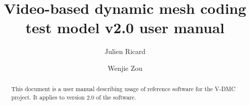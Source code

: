 \documentclass[a4paper,11pt]{mpegdoc}
\title{Video-based dynamic mesh coding test model v2.0 user manual}
\author{%
  Julien Ricard	\email{julien.ricard@interdital.com}  
\and
  Wenjie Zou \email{wjzou@xidian.edu.cn} 
}
\begin{document}
\maketitle
\begin{abstract}
This document is a user manual describing usage of reference software
for the V-DMC project. It applies to version 2.0 of the software.
\end{abstract}
\newpage

\tableofcontents

\newpage








 



%
\end{document}
